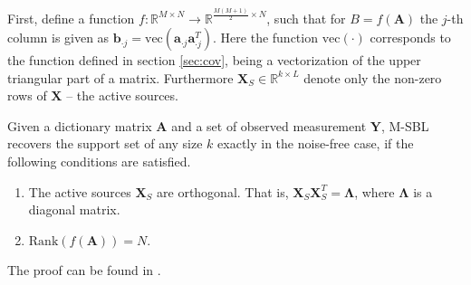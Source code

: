 First, define a function $f:\mathbb{R}^{M \times N} \rightarrow \mathbb{R}^{\frac{M(M+1)}{2}\times N}$, such that for $B = f(\mathbf{A})$ the $j$-th column is given as $\mathbf{b}_{\cdot j} = \text{vec}(\mathbf{a}_{\cdot j}\mathbf{a}_{\cdot j}^T)$. Here the function $\text{vec}(\cdot)$ corresponds to the function defined in section \ref{sec:cov}, being a vectorization of the upper triangular part of a matrix. Furthermore $\mathbf{X}_S\in \mathbb{R}^{k\times L}$ denote only the non-zero rows of $\textbf{X}$ -- the active sources.  
\begin{theorem}
Given a dictionary matrix $\mathbf{A}$ and a set of observed measurement $\mathbf{Y}$, M-SBL recovers the support set of any size $k$ exactly in the noise-free case, if the following conditions are satisfied. 
\begin{enumerate}
\item The active sources $\mathbf{X}_S$ are orthogonal. That is, $\mathbf{X}_S \mathbf{X}_S^T = \boldsymbol{\Lambda}$, where $\boldsymbol{\Lambda}$ is a diagonal matrix.
\item $\text{Rank}(f(\mathbf{A}))= N$.
\end{enumerate}
The proof can be found in \cite[p. 16]{Balkan2014}.


\label{th:conditions}
\end{theorem}  


